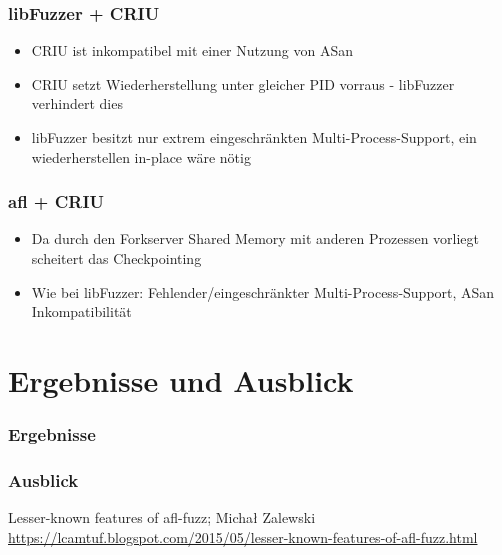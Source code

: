 \documentclass[handout]{beamer}
\begin{document}
\begin{frame}
    \frametitle{libFuzzer + CRIU}
    \begin{itemize}
        \item CRIU ist inkompatibel mit einer Nutzung von ASan
        \item CRIU setzt Wiederherstellung unter gleicher PID vorraus - libFuzzer verhindert dies
        \item libFuzzer besitzt nur extrem eingeschränkten Multi-Process-Support, ein wiederherstellen in-place wäre nötig
    \end{itemize}
\end{frame}

\begin{frame}
    \frametitle{afl + CRIU}
    \begin{itemize}
        \item Da durch den Forkserver Shared Memory mit anderen Prozessen vorliegt scheitert das Checkpointing
        \item Wie bei libFuzzer: Fehlender/eingeschränkter Multi-Process-Support, ASan Inkompatibilität
    \end{itemize}
\end{frame}

\section{Ergebnisse und Ausblick}

\begin{frame}
    \frametitle{Ergebnisse}

\end{frame}

\begin{frame}
    \frametitle{Ausblick}
\end{frame}

\begin{frame}

\end{frame}

\begin{thebibliography}{}
    Lesser-known features of afl-fuzz; Michał Zalewski \url{https://lcamtuf.blogspot.com/2015/05/lesser-known-features-of-afl-fuzz.html}
\end{thebibliography}
\end{document}

